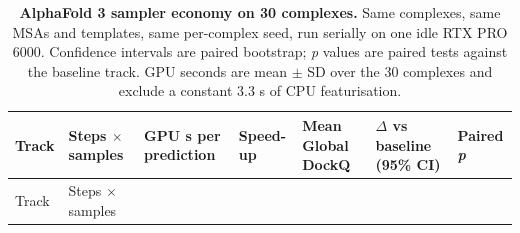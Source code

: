\documentclass[
  11pt,
]{article}
\begin{document}
\begin{longtable}[]{@{}
  >{\raggedright\arraybackslash}p{}
  >{\raggedright\arraybackslash}p{}
  >{\raggedright\arraybackslash}p{}
  >{\raggedleft\arraybackslash}p{}
  >{\raggedleft\arraybackslash}p{}
  >{\raggedright\arraybackslash}p{}
  >{\raggedleft\arraybackslash}p{}@{}}
\caption{\textbf{AlphaFold 3 sampler economy on 30 complexes.} Same
complexes, same MSAs and templates, same per-complex seed, run serially
on one idle RTX PRO 6000. Confidence intervals are paired bootstrap;
\emph{p} values are paired tests against the baseline track. GPU seconds
are mean \ensuremath{\pm} SD over the 30 complexes and exclude a constant 3.3 s of CPU
featurisation.}\tabularnewline
\toprule\noalign{}
\begin{minipage}[b]{\linewidth}\raggedright
Track
\end{minipage} & \begin{minipage}[b]{\linewidth}\raggedright
Steps \ensuremath{\times} samples
\end{minipage} & \begin{minipage}[b]{\linewidth}\raggedright
GPU s per prediction
\end{minipage} & \begin{minipage}[b]{\linewidth}\raggedleft
Speed-up
\end{minipage} & \begin{minipage}[b]{\linewidth}\raggedleft
Mean Global DockQ
\end{minipage} & \begin{minipage}[b]{\linewidth}\raggedright
\ensuremath{\Delta} vs baseline (95\% CI)
\end{minipage} & \begin{minipage}[b]{\linewidth}\raggedleft
Paired \emph{p}
\end{minipage} \\
\midrule\noalign{}
\endfirsthead
\toprule\noalign{}
\begin{minipage}[b]{\linewidth}\raggedright
Track
\end{minipage} & \begin{minipage}[b]{\linewidth}\raggedright
Steps \ensuremath{\times} samples
\end{minipage} & \begin{minipage}[b]{\linewidth}\raggedright

\end{minipage}
\end{longtable}
\end{document}
